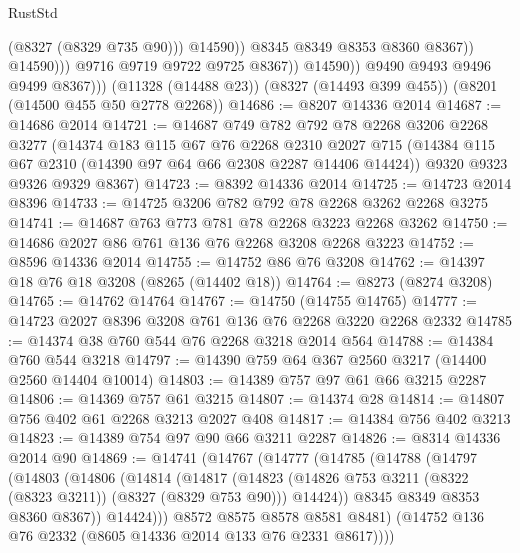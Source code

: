 \begin{lexlean}{RustStd}
\begin{coremodule}
{\begin{coremodule}
{{{{{{{{{{{{{{{{{{{{{{{{{{{{{{{{{{{{{{{{{{{{{{{{{{{{{{                                  (@8327 (@8329 @735 @90)))
                                @14590))
                            @8345
                            @8349
                            @8353
                            @8360
                            @8367))
                        @14590)))
                  @9716
                  @9719
                  @9722
                  @9725
                  @8367))
              @14590))
          @9490
          @9493
          @9496
          @9499
          @8367)))
    (@11328 (@14488 @23))
    (@8327 (@14493 @399 @455))
    (@8201 (@14500 @455 @50 @2778 @2268))
@14686 := @8207 @14336 @2014
@14687 := @14686 @2014
@14721 := @14687
    @749
    @782
    @792
    @78
    @2268
    @3206
    @2268
    @3277
    (@14374
      @183
      @115
      @67
      @76
      @2268
      @2310
      @2027
      @715
      (@14384 @115 @67 @2310 (@14390 @97 @64 @66 @2308 @2287 @14406 @14424))
      @9320
      @9323
      @9326
      @9329
      @8367)
@14723 := @8392 @14336 @2014
@14725 := @14723 @2014 @8396
@14733 := @14725 @3206 @782 @792 @78 @2268 @3262 @2268 @3275
@14741 := @14687 @763 @773 @781 @78 @2268 @3223 @2268 @3262
@14750 := @14686 @2027 @86 @761 @136 @76 @2268 @3208 @2268 @3223
@14752 := @8596 @14336 @2014
@14755 := @14752 @86 @76 @3208
@14762 := @14397 @18 @76 @18 @3208 (@8265 (@14402 @18))
@14764 := @8273 (@8274 @3208)
@14765 := @14762 @14764
@14767 := @14750 (@14755 @14765)
@14777 := @14723 @2027 @8396 @3208 @761 @136 @76 @2268 @3220 @2268 @2332
@14785 := @14374 @38 @760 @544 @76 @2268 @3218 @2014 @564
@14788 := @14384 @760 @544 @3218
@14797 := @14390 @759 @64 @367 @2560 @3217 (@14400 @2560 @14404 @10014)
@14803 := @14389 @757 @97 @61 @66 @3215 @2287
@14806 := @14369 @757 @61 @3215
@14807 := @14374 @28
@14814 := @14807 @756 @402 @61 @2268 @3213 @2027 @408
@14817 := @14384 @756 @402 @3213
@14823 := @14389 @754 @97 @90 @66 @3211 @2287
@14826 := @8314 @14336 @2014 @90
@14869 := @14741
    (@14767
      (@14777
        (@14785
          (@14788
            (@14797
              (@14803
                (@14806
                  (@14814
                    (@14817
                      (@14823
                        (@14826 @753 @3211 (@8322 (@8323 @3211)) (@8327 (@8329 @753 @90)))
                        @14424))
                    @8345
                    @8349
                    @8353
                    @8360
                    @8367))
                @14424)))
          @8572
          @8575
          @8578
          @8581
          @8481)
        (@14752 @136 @76 @2332 (@8605 @14336 @2014 @133 @76 @2331 @8617))))
}}}}}}}}}}}}}}}}}}}}}}}}}}}}}}}}}}}}}}}}}}}}}}}}}}}}}}
\end{coremodule}}
\end{coremodule}
\end{lexlean}
